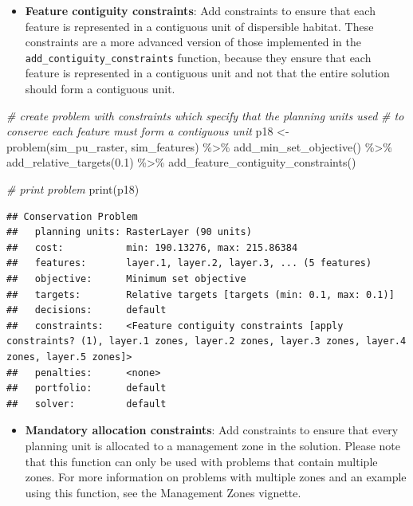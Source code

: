 \documentclass[
  12pt,
]{book}
\newenvironment{Shaded}{\begin{snugshade}}{\end{snugshade}}
\newcommand{\CommentTok}[1]{\textcolor[rgb]{0.56,0.35,0.01}{\textit{#1}}}
\newcommand{\FloatTok}[1]{\textcolor[rgb]{0.00,0.00,0.81}{#1}}
\newcommand{\FunctionTok}[1]{\textcolor[rgb]{0.00,0.00,0.00}{#1}}
\newcommand{\NormalTok}[1]{#1}
\newcommand{\OtherTok}[1]{\textcolor[rgb]{0.56,0.35,0.01}{#1}}
\newcommand{\SpecialCharTok}[1]{\textcolor[rgb]{0.00,0.00,0.00}{#1}}
\providecommand{\tightlist}{%
  \setlength{\itemsep}{0pt}\setlength{\parskip}{0pt}}
\begin{document}
\begin{itemize}
\tightlist
\item
  \textbf{Feature contiguity constraints}: Add constraints to ensure that each feature is represented in a contiguous unit of dispersible habitat. These constraints are a more advanced version of those implemented in the \texttt{add\_contiguity\_constraints} function, because they ensure that each feature is represented in a contiguous unit and not that the entire solution should form a contiguous unit.
\end{itemize}

\begin{Shaded}
\begin{Highlighting}[]
\CommentTok{\# create problem with constraints which specify that the planning units used}
\CommentTok{\# to conserve each feature must form a contiguous unit}
\NormalTok{p18 }\OtherTok{\textless{}{-}} \FunctionTok{problem}\NormalTok{(sim\_pu\_raster, sim\_features) }\SpecialCharTok{\%\textgreater{}\%}
  \FunctionTok{add\_min\_set\_objective}\NormalTok{() }\SpecialCharTok{\%\textgreater{}\%}
  \FunctionTok{add\_relative\_targets}\NormalTok{(}\FloatTok{0.1}\NormalTok{) }\SpecialCharTok{\%\textgreater{}\%}
  \FunctionTok{add\_feature\_contiguity\_constraints}\NormalTok{()}

\CommentTok{\# print problem}
\FunctionTok{print}\NormalTok{(p18)}
\end{Highlighting}
\end{Shaded}

\begin{verbatim}
## Conservation Problem
##   planning units: RasterLayer (90 units)
##   cost:           min: 190.13276, max: 215.86384
##   features:       layer.1, layer.2, layer.3, ... (5 features)
##   objective:      Minimum set objective 
##   targets:        Relative targets [targets (min: 0.1, max: 0.1)]
##   decisions:      default
##   constraints:    <Feature contiguity constraints [apply constraints? (1), layer.1 zones, layer.2 zones, layer.3 zones, layer.4 zones, layer.5 zones]>
##   penalties:      <none>
##   portfolio:      default
##   solver:         default
\end{verbatim}

\begin{itemize}
\tightlist
\item
  \textbf{Mandatory allocation constraints}: Add constraints to ensure that every planning unit is allocated to a management zone in the solution. Please note that this function can only be used with problems that contain multiple zones. For more information on problems with multiple zones and an example using this function, see the Management Zones vignette.
\end{itemize}
\end{document}
